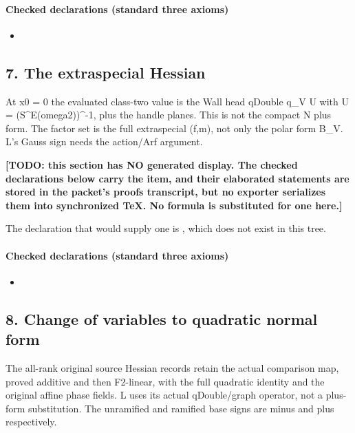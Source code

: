 \paragraph{Checked declarations (standard three axioms)}
\begin{itemize}
\item {}
\end{itemize}

\subsection*{7. The extraspecial Hessian}
At x0 = 0 the evaluated class-two value is the Wall head qDouble q\_V U with U = (S\textasciicircum{}E(omega2))\textasciicircum{}-1, plus the handle planes. This is not the compact N plus form. The factor set is the full extraspecial (f,m), not only the polar form B\_V. L's Gauss sign needs the action/Arf argument.

\par\noindent\textbf{[TODO: this section has NO generated display. The checked declarations below carry the item, and their elaborated statements are stored in the packet's proofs transcript, but no exporter serializes them into synchronized TeX. No formula is substituted for one here.]}
\par\noindent The declaration that would supply one is , which does not exist in this tree.
\paragraph{Checked declarations (standard three axioms)}
\begin{itemize}
\item {}
\end{itemize}

\subsection*{8. Change of variables to quadratic normal form}
The all-rank original source Hessian records retain the actual comparison map, proved additive and then F2-linear, with the full quadratic identity and the original affine phase fields. L uses its actual qDouble/graph operator, not a plus-form substitution. The unramified and ramified base signs are minus and plus respectively.

